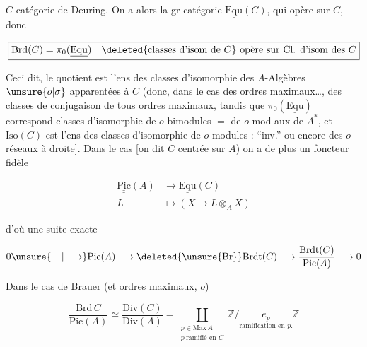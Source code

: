 $C$ catégorie de Deuring. On a alors la gr-catégorie $\underline{\mathrm{Equ}}(C)$, qui opère sur $C$, donc

\[
\boxed{\mathrm{Brd}(C)=\pi_0(\underline{\mathrm{Equ}})\quad
\deleted{\text{classes d'isom de }C}\ \text{opère sur Cl. d'isom des }C}
\]

Ceci dit, le quotient est l'ens des classes d'isomorphie des $A$-Algèbres $\unsure{o|\sigma}$ apparentées à $C$ (donc, dans le cas des  ordres maximaux\ldots,  des classes de conjugaison de tous ordres maximaux, tandis que $\pi_0(\underline{\mathrm{Equ}})$ correspond   classes d'isomorphie de $o$-bimodules $=$  de $o$ mod aux  de  $A^*$,  et $\mathrm{Iso}(C)$ est l'ens des classes d'isomorphie de $o$-modules :  ``inv.''  ou encore des $o$-réseaux  à droite]. Dans le cas     [on dit $C$ centrée sur $A$) on a de plus un foncteur \uline{ fidèle}

\[
\begin{aligned}
\underline{\underline{\mathrm{Pic}}}(A)&\longrightarrow\underline{\mathrm{Equ}}(C)\\
L&\longmapsto(X\longmapsto L\otimes_A X)
\end{aligned}
\]

d'où une suite exacte

\[
0\unsure{\mathrel{-}|\longrightarrow}\mathrm{Pic}(A)\longrightarrow
\deleted{\unsure{\mathrm{Br}}}\mathrm{Brdt}(C)\longrightarrow
\frac{\mathrm{Brdt}(C)}{\mathrm{Pic}(A)}\longrightarrow 0
\]

Dans le cas de Brauer (et ordres maximaux, $o$)

\[
\frac{\mathrm{Brd}\,C}{\mathrm{Pic}(A)}\simeq
\frac{\mathrm{Div}(C)}{\mathrm{Div}(A)}=
\underset{\substack{p\in\mathrm{Max}\,A\\p\ \text{ramifié en }C}}{\coprod}
\mathbb{Z}/\underset{\text{ramification en }p.}{e_p}\mathbb Z
\]

